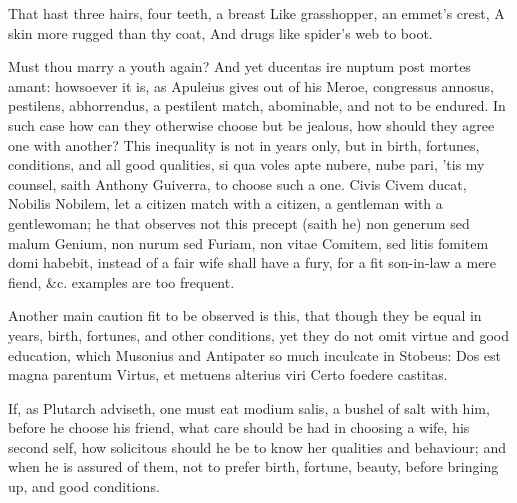 {That hast three hairs, four teeth, a breast
Like grasshopper, an emmet's crest,
A skin more rugged than thy coat,
And drugs like spider's web to boot.

Must thou marry a youth again? And yet ducentas ire nuptum post mortes
amant: howsoever it is, as Apuleius gives out of his Meroe,
congressus annosus, pestilens, abhorrendus, a pestilent match,
abominable, and not to be endured. In such case how can they otherwise
choose but be jealous, how should they agree one with another? This
inequality is not in years only, but in birth, fortunes, conditions,
and all good qualities, si qua voles apte nubere, nube pari, 'tis
my counsel, saith Anthony Guiverra, to choose such a one. Civis Civem
ducat, Nobilis Nobilem, let a citizen match with a citizen, a gentleman
with a gentlewoman; he that observes not this precept (saith he) non
generum sed malum Genium, non nurum sed Furiam, non vitae Comitem, sed
litis fomitem domi habebit, instead of a fair wife shall have a fury,
for a fit son-in-law a mere fiend, \&c. examples are too frequent.

Another main caution fit to be observed is this, that though they be
equal in years, birth, fortunes, and other conditions, yet they do not
omit virtue and good education, which Musonius and Antipater so much
inculcate in Stobeus:
Dos est magna parentum
Virtus, et metuens alterius viri
Certo foedere castitas.

If, as Plutarch adviseth, one must eat modium salis, a bushel of salt
with him, before he choose his friend, what care should be had in
choosing a wife, his second self, how solicitous should he be to know
her qualities and behaviour; and when he is assured of them, not to
prefer birth, fortune, beauty, before bringing up, and good conditions.

}
